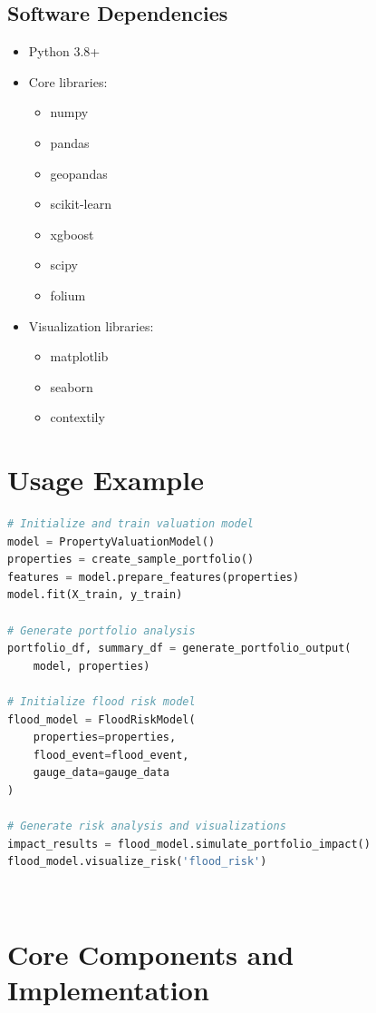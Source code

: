 \documentclass{article}
\begin{document}
\subsection{Software Dependencies}
\begin{itemize}
    \item Python 3.8+
    \item Core libraries:
    \begin{itemize}
        \item numpy
        \item pandas
        \item geopandas
        \item scikit-learn
        \item xgboost
        \item scipy
        \item folium
    \end{itemize}
    \item Visualization libraries:
    \begin{itemize}
        \item matplotlib
        \item seaborn
        \item contextily
    \end{itemize}
\end{itemize}

\section{Usage Example}
\begin{lstlisting}[language=Python]
# Initialize and train valuation model
model = PropertyValuationModel()
properties = create_sample_portfolio()
features = model.prepare_features(properties)
model.fit(X_train, y_train)

# Generate portfolio analysis
portfolio_df, summary_df = generate_portfolio_output(
    model, properties)

# Initialize flood risk model
flood_model = FloodRiskModel(
    properties=properties,
    flood_event=flood_event,
    gauge_data=gauge_data
)

# Generate risk analysis and visualizations
impact_results = flood_model.simulate_portfolio_impact()
flood_model.visualize_risk('flood_risk')
\end{lstlisting}


\
\section{Core Components and Implementation}
\end{document}

